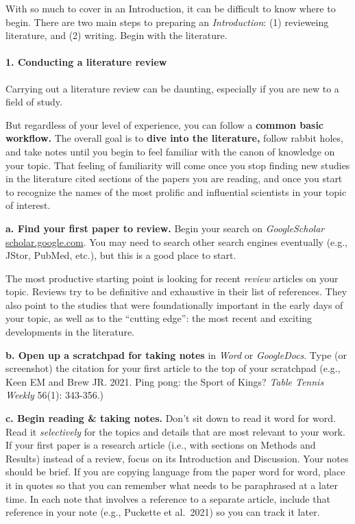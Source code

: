 \documentclass[]{book}
\let\oldparagraph\paragraph
\renewcommand{\paragraph}[1]{\oldparagraph{#1}\mbox{}}
\begin{document}
With so much to cover in an Introduction, it can be difficult to know where to begin. There are two main steps to preparing an \emph{Introduction}: (1) revieweing literature, and (2) writing. Begin with the literature.

\hypertarget{conducting-a-literature-review}{%
\paragraph{1. Conducting a literature review}\label{conducting-a-literature-review}}

Carrying out a literature review can be daunting, especially if you are new to a field of study.

But regardless of your level of experience, you can follow a \textbf{common basic workflow.} The overall goal is to \textbf{dive into the literature,} follow rabbit holes, and take notes until you begin to feel familiar with the canon of knowledge on your topic. That feeling of familiarity will come once you stop finding new studies in the literature cited sections of the papers you are reading, and once you start to recognize the names of the most prolific and influential scientists in your topic of interest.

\textbf{a. Find your first paper to review.} Begin your search on \emph{GoogleScholar} \url{scholar.google.com}. You may need to search other search engines eventually (e.g., JStor, PubMed, etc.), but this is a good place to start.

The most productive starting point is looking for recent \emph{review} articles on your topic. Reviews try to be definitive and exhaustive in their list of references. They also point to the studies that were foundationally important in the early days of your topic, as well as to the ``cutting edge'': the most recent and exciting developments in the literature.

\textbf{b. Open up a scratchpad for taking notes} in \emph{Word} or \emph{GoogleDocs}. Type (or screenshot) the citation for your first article to the top of your scratchpad (e.g., Keen EM and Brew JR. 2021. Ping pong: the Sport of Kings? \emph{Table Tennis Weekly} 56(1): 343-356.)

\textbf{c. Begin reading \& taking notes.} Don't sit down to read it word for word. Read it \emph{selectively} for the topics and details that are most relevant to your work. If your first paper is a research article (i.e., with sections on Methods and Results) instead of a review, focus on its Introduction and Discussion. Your notes should be brief. If you are copying language from the paper word for word, place it in quotes so that you can remember what needs to be paraphrased at a later time. In each note that involves a reference to a separate article, include that reference in your note (e.g.,
Puckette et al.~2021) so you can track it later.
\end{document}
